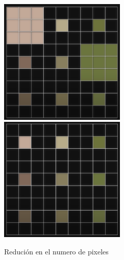 \documentclass{article}
\begin{document}
\begin{figure}[h]
\includegraphics[width=6cm]{MatrizCompleta.png}
\includegraphics[width=6cm]{MatrizReducida.png}
\centering
\caption{Redución en el numero de pixeles}
\label{fig:matriz de leds}
\end{figure}




\end{document}
